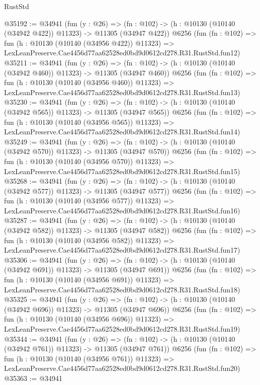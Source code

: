 \begin{lexlean}{RustStd}
\begin{coremodule}
@35192 := @34941
    (fun (y : @26) =>
    (fn : @102) -> (h : @10130 (@10140 (@34942 @422)) @11323) -> @11305 (@34947 @422))
    @6256
    (fun (fn : @102) =>
    fun (h : @10130 (@10140 (@34956 @422)) @11323) =>
    LexLeanPreserve.Cae4456d77aa62528ed0bd9d0612cd278.R31.RustStd.fun12)
@35211 := @34941
    (fun (y : @26) =>
    (fn : @102) -> (h : @10130 (@10140 (@34942 @460)) @11323) -> @11305 (@34947 @460))
    @6256
    (fun (fn : @102) =>
    fun (h : @10130 (@10140 (@34956 @460)) @11323) =>
    LexLeanPreserve.Cae4456d77aa62528ed0bd9d0612cd278.R31.RustStd.fun13)
@35230 := @34941
    (fun (y : @26) =>
    (fn : @102) -> (h : @10130 (@10140 (@34942 @565)) @11323) -> @11305 (@34947 @565))
    @6256
    (fun (fn : @102) =>
    fun (h : @10130 (@10140 (@34956 @565)) @11323) =>
    LexLeanPreserve.Cae4456d77aa62528ed0bd9d0612cd278.R31.RustStd.fun14)
@35249 := @34941
    (fun (y : @26) =>
    (fn : @102) -> (h : @10130 (@10140 (@34942 @570)) @11323) -> @11305 (@34947 @570))
    @6256
    (fun (fn : @102) =>
    fun (h : @10130 (@10140 (@34956 @570)) @11323) =>
    LexLeanPreserve.Cae4456d77aa62528ed0bd9d0612cd278.R31.RustStd.fun15)
@35268 := @34941
    (fun (y : @26) =>
    (fn : @102) -> (h : @10130 (@10140 (@34942 @577)) @11323) -> @11305 (@34947 @577))
    @6256
    (fun (fn : @102) =>
    fun (h : @10130 (@10140 (@34956 @577)) @11323) =>
    LexLeanPreserve.Cae4456d77aa62528ed0bd9d0612cd278.R31.RustStd.fun16)
@35287 := @34941
    (fun (y : @26) =>
    (fn : @102) -> (h : @10130 (@10140 (@34942 @582)) @11323) -> @11305 (@34947 @582))
    @6256
    (fun (fn : @102) =>
    fun (h : @10130 (@10140 (@34956 @582)) @11323) =>
    LexLeanPreserve.Cae4456d77aa62528ed0bd9d0612cd278.R31.RustStd.fun17)
@35306 := @34941
    (fun (y : @26) =>
    (fn : @102) -> (h : @10130 (@10140 (@34942 @691)) @11323) -> @11305 (@34947 @691))
    @6256
    (fun (fn : @102) =>
    fun (h : @10130 (@10140 (@34956 @691)) @11323) =>
    LexLeanPreserve.Cae4456d77aa62528ed0bd9d0612cd278.R31.RustStd.fun18)
@35325 := @34941
    (fun (y : @26) =>
    (fn : @102) -> (h : @10130 (@10140 (@34942 @696)) @11323) -> @11305 (@34947 @696))
    @6256
    (fun (fn : @102) =>
    fun (h : @10130 (@10140 (@34956 @696)) @11323) =>
    LexLeanPreserve.Cae4456d77aa62528ed0bd9d0612cd278.R31.RustStd.fun19)
@35344 := @34941
    (fun (y : @26) =>
    (fn : @102) -> (h : @10130 (@10140 (@34942 @761)) @11323) -> @11305 (@34947 @761))
    @6256
    (fun (fn : @102) =>
    fun (h : @10130 (@10140 (@34956 @761)) @11323) =>
    LexLeanPreserve.Cae4456d77aa62528ed0bd9d0612cd278.R31.RustStd.fun20)
@35363 := @34941

\end{coremodule}
\end{lexlean}
